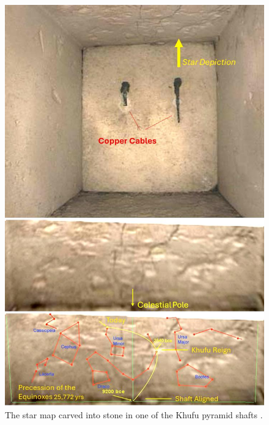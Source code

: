 \documentclass[10pt,twocolumn,letterpaper]{article}
\begin{document}
\begin{figure}[H]
\begin{center}
   \includegraphics[width=1\linewidth]{star-stone.jpg}
\end{center}
   \caption{The star map carved into stone in one of the Khufu pyramid shafts \cite{28}.}
\label{fig:20}
\label{fig:onecol}
\end{figure}
\end{document}
